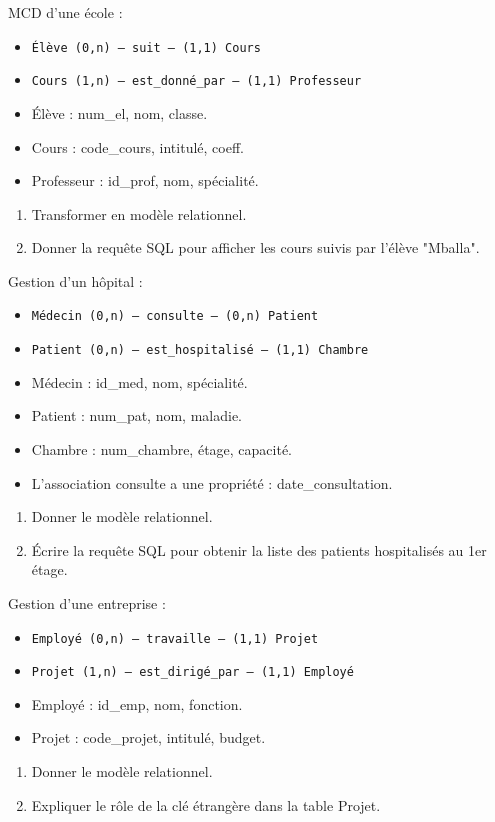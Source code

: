 \exo{}
MCD d'une école :
\begin{itemize}
    \item \texttt{Élève (0,n) --- suit --- (1,1) Cours}
    \item \texttt{Cours (1,n) --- est\_donné\_par --- (1,1) Professeur}
    \item Élève : num\_el, nom, classe.
    \item Cours : code\_cours, intitulé, coeff.
    \item Professeur : id\_prof, nom, spécialité.
\end{itemize}
\begin{enumerate}
    \item Transformer en modèle relationnel.
    \item Donner la requête SQL pour afficher les cours suivis par l'élève "Mballa".
\end{enumerate}

\exo{}
Gestion d'un hôpital :
\begin{itemize}
    \item \texttt{Médecin (0,n) --- consulte --- (0,n) Patient}
    \item \texttt{Patient (0,n) --- est\_hospitalisé --- (1,1) Chambre}
    \item Médecin : id\_med, nom, spécialité.
    \item Patient : num\_pat, nom, maladie.
    \item Chambre : num\_chambre, étage, capacité.
    \item L'association consulte a une propriété : date\_consultation.
\end{itemize}
\begin{enumerate}
    \item Donner le modèle relationnel.
    \item Écrire la requête SQL pour obtenir la liste des patients hospitalisés au 1er étage.
\end{enumerate}

\exo{}
Gestion d'une entreprise :
\begin{itemize}
    \item \texttt{Employé (0,n) --- travaille --- (1,1) Projet}
    \item \texttt{Projet (1,n) --- est\_dirigé\_par --- (1,1) Employé}
    \item Employé : id\_emp, nom, fonction.
    \item Projet : code\_projet, intitulé, budget.
\end{itemize}
\begin{enumerate}
    \item Donner le modèle relationnel.
    \item Expliquer le rôle de la clé étrangère dans la table Projet.
\end{enumerate}

